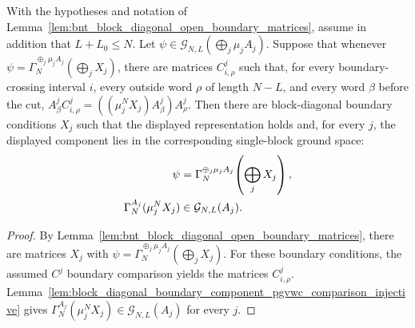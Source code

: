 \begin{lemma}
    \label{lem:block_diagonal_boundary_periodic_components_from_pgvwc_comparison}
    \leanok
    With the hypotheses and notation of
    Lemma~\ref{lem:bnt_block_diagonal_open_boundary_matrices}, assume in
    addition that $L+L_0\le N$. Let
    $\psi\in\mathcal G_{N,L}(\bigoplus_j\mu_jA_j)$. Suppose that whenever
    $\psi=\Gamma_N^{\oplus_j\mu_jA_j}(\bigoplus_jX_j)$, there are matrices
    $C^j_{i,\rho}$ such that, for every boundary-crossing interval $i$, every
    outside word $\rho$ of length $N-L$, and every word $\beta$ before the cut,
    $A^j_\beta C^j_{i,\rho} = ((\mu_j^NX_j)A^j_\beta)A^j_\rho$.
    Then there are block-diagonal boundary conditions $X_j$ such that the displayed
    representation holds and, for every $j$, the displayed component lies in
    the corresponding single-block ground space:
    \begin{align}
        \psi
         & =
        \Gamma_N^{\oplus_j\mu_jA_j}\!\left(\bigoplus_jX_j\right),
        \notag                       \\
        \Gamma_N^{A_j}(\mu_j^NX_j)
         & \in\mathcal G_{N,L}(A_j).
        \notag
    \end{align}
\end{lemma}

\begin{proof}
    \leanok
    By Lemma~\ref{lem:bnt_block_diagonal_open_boundary_matrices}, there are
    matrices $X_j$ with
    $\psi=\Gamma_N^{\oplus_j\mu_jA_j}(\bigoplus_jX_j)$.
    For these boundary conditions, the assumed $C^j$ boundary comparison
    yields the matrices $C^j_{i,\rho}$.
    Lemma~\ref{lem:block_diagonal_boundary_component_pgvwc_comparison_injective}
    gives $\Gamma_N^{A_j}(\mu_j^NX_j)\in\mathcal G_{N,L}(A_j)$ for every $j$.
\end{proof}

